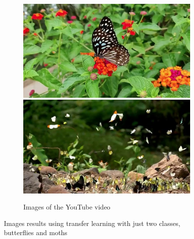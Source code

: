 \documentclass{cpsc202}
\begin{document}
\begin{figure}
        \begin{subfigure}{.9\textwidth}
            \centering
            \includegraphics[width=.4\linewidth]{trained_two_classes/photogram_16}
            \includegraphics[width=.4\linewidth]{trained_two_classes/photogram_93}
            \caption{Images of the YouTube video}
            \label{fig:video-trained_two_classes}
        \end{subfigure}
        \caption{Images results using transfer learning with just two classes, butterflies and moths}
        \label{fig:trained_two_classes}
    \end{figure}
\end{document}
